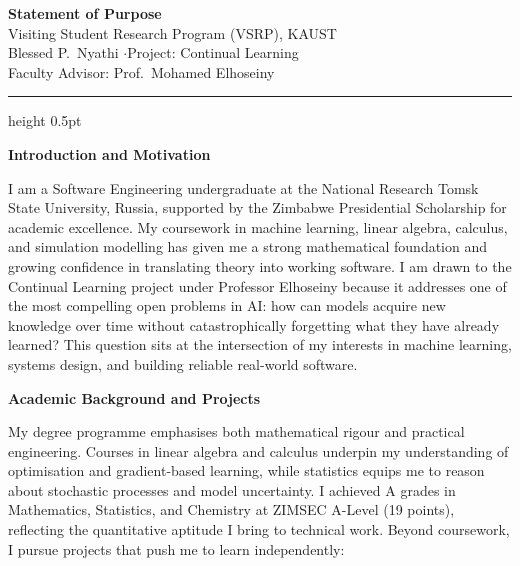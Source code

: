 \documentclass[11pt,a4paper]{article}
\begin{document}
\begin{center}
  {\Large\bfseries\color{NavyBlue} Statement of Purpose}\\[0.6em]
  {\large Visiting Student Research Program (VSRP), KAUST}\\[0.3em]
  {\color{DarkGray} Blessed P.\ Nyathi \quad$\cdot$\quad Project: Continual Learning}\\[0.1em]
  {\color{DarkGray}\small Faculty Advisor: Prof.\ Mohamed Elhoseiny}
\end{center}

\vspace{0.3em}
{\color{gray}\hrule height 0.5pt}
\vspace{0.6em}


\textbf{\color{NavyBlue}Introduction and Motivation}

I am a Software Engineering undergraduate at the National Research Tomsk State University, Russia, supported by the Zimbabwe Presidential Scholarship for academic excellence. My coursework in machine learning, linear algebra, calculus, and simulation modelling has given me a strong mathematical foundation and growing confidence in translating theory into working software. I am drawn to the Continual Learning project under Professor Elhoseiny because it addresses one of the most compelling open problems in AI: how can models acquire new knowledge over time without catastrophically forgetting what they have already learned? This question sits at the intersection of my interests in machine learning, systems design, and building reliable real-world software.

\textbf{\color{NavyBlue}Academic Background and Projects}

My degree programme emphasises both mathematical rigour and practical engineering. Courses in linear algebra and calculus underpin my understanding of optimisation and gradient-based learning, while statistics equips me to reason about stochastic processes and model uncertainty. I achieved A grades in Mathematics, Statistics, and Chemistry at ZIMSEC A-Level (19 points), reflecting the quantitative aptitude I bring to technical work. Beyond coursework, I pursue projects that push me to learn independently:
\end{document}
